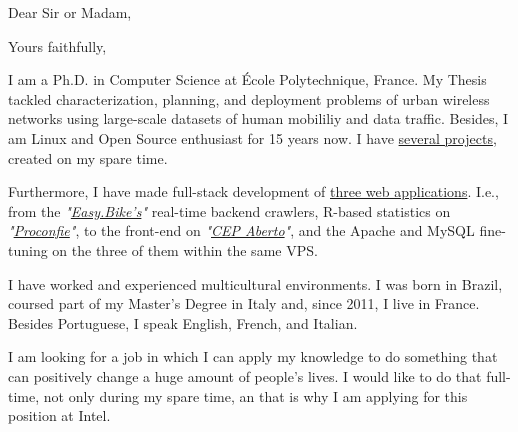 \date{\today}
\opening{Dear Sir or Madam,}
\closing{Yours faithfully,}
\makelettertitle

I am a Ph.D. in Computer Science at École Polytechnique, France. My Thesis tackled characterization, planning, and deployment problems of urban wireless networks using large-scale datasets of human mobililiy and data traffic. Besides, I am Linux and Open Source enthusiast for 15 years now. I have \hyperref[sec:open_source]{several projects}, created on my spare time.

Furthermore, I have made full-stack development of \hyperref[sec:web_app]{three web applications}. I.e., from the \textit{"\href{http://easy.bike}{Easy.Bike's}"} real-time backend crawlers, R-based statistics on \textit{"\href{http://www.proconfie.com}{Proconfie}"}, to the front-end on \textit{"\href{http://www.cepaberto.com}{CEP Aberto}"}, and the Apache and MySQL fine-tuning on the three of them within the same VPS.


I have worked and experienced multicultural environments. I was born in Brazil, coursed part of my Master's Degree in Italy and, since 2011, I live in France. Besides Portuguese, I speak English, French, and Italian.

I am looking for a job in which I can apply my knowledge to do something that can positively change a huge amount of people's lives. I would like to do that full-time, not only during my spare time, an that is why I am applying for this position at Intel.

\makeletterclosing